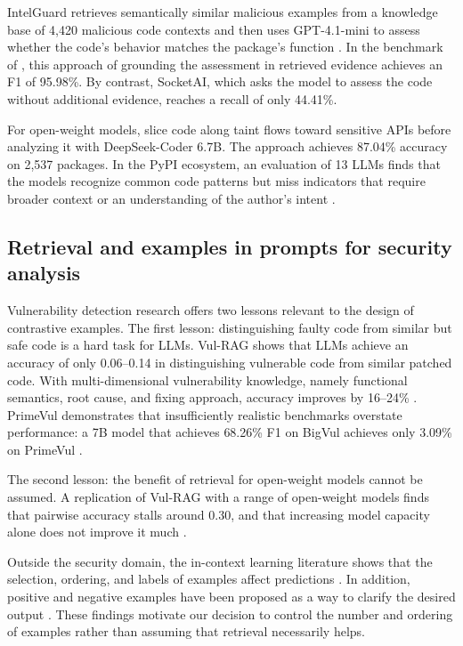 \documentclass[a4paper,fleqn]{cas-dc}
\begin{document}
IntelGuard retrieves semantically similar malicious examples from a knowledge
base of 4,420 malicious code contexts and then uses GPT-4.1-mini to assess
whether the code's behavior matches the package's function
\citep{guo2026bridging}. In the benchmark of \citet{guo2026effective}, this
approach of grounding the assessment in retrieved evidence achieves an F1 of
95.98\%. By contrast, SocketAI, which asks the model to assess the code without
additional evidence, reaches a recall of only 44.41\%.

For open-weight models, \citet{nguyen2025taint} slice code along taint flows
toward sensitive APIs before analyzing it with DeepSeek-Coder 6.7B. The approach
achieves 87.04\% accuracy on 2,537 packages. In the PyPI ecosystem, an evaluation
of 13 LLMs finds that the models recognize common code patterns but miss
indicators that require broader context or an understanding of the author's
intent \citep{ryan2026evaluation}.

\subsection{Retrieval and examples in prompts for security analysis}

Vulnerability detection research offers two lessons relevant to the design of
contrastive examples. The first lesson: distinguishing faulty code from similar
but safe code is a hard task for LLMs. Vul-RAG shows that LLMs achieve an
accuracy of only 0.06--0.14 in distinguishing vulnerable code from similar
patched code. With multi-dimensional vulnerability knowledge, namely functional
semantics, root cause, and fixing approach, accuracy improves by 16--24\%
\citep{du2026vulrag}. PrimeVul demonstrates that insufficiently realistic
benchmarks overstate performance: a 7B model that achieves 68.26\% F1 on BigVul
achieves only 3.09\% on PrimeVul \citep{ding2025vulnerability}.

The second lesson: the benefit of retrieval for open-weight models cannot be
assumed. A replication of Vul-RAG with a range of open-weight models finds that
pairwise accuracy stalls around 0.30, and that increasing model capacity alone
does not improve it much \citep{kaniewski2026revisiting}.

Outside the security domain, the in-context learning literature shows that the
selection, ordering, and labels of examples affect predictions
\citep{liu2022makes,zhao2021calibrate,min2022rethinking}. In addition, positive
and negative examples have been proposed as a way to clarify the desired output
\citep{gao2024customizing}. These findings motivate our decision to control the
number and ordering of examples rather than assuming that retrieval necessarily
helps.
\end{document}
